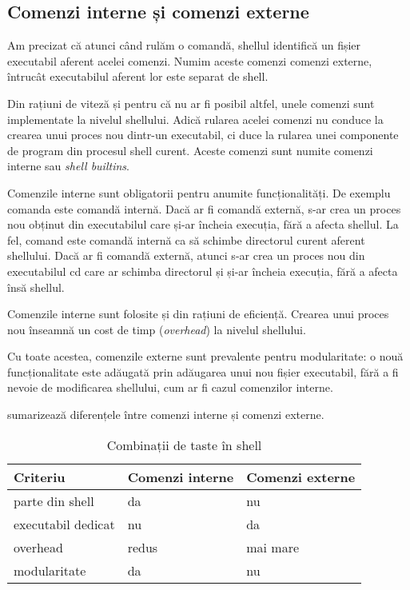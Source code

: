 \subsection{Comenzi interne și comenzi externe}
\label{sec:cli:shell:command-types}

Am precizat că atunci când rulăm o comandă, shellul identifică un fișier
executabil aferent acelei comenzi. Numim aceste comenzi comenzi externe,
întrucât executabilul aferent lor este separat de shell.

Din rațiuni de viteză și pentru că nu ar fi posibil altfel, unele comenzi sunt
implementate la nivelul shellului. Adică rularea acelei comenzi nu conduce la
crearea unui proces nou dintr-un executabil, ci duce la rularea unei componente
de program din procesul shell curent. Aceste comenzi sunt numite comenzi interne
sau \textit{shell builtins}.

Comenzile interne sunt obligatorii pentru anumite funcționalități. De exemplu
comanda  este comandă internă. Dacă ar fi comandă externă, s-ar crea un
proces nou obținut din executabilul  care și-ar încheia execuția, fără a
afecta shellul. La fel, comand  este comandă internă ca să schimbe directorul
curent aferent shellului. Dacă ar fi comandă externă, atunci s-ar crea un
proces nou din executabilul cd care ar schimba directorul și și-ar încheia
execuția, fără a afecta însă shellul.

Comenzile interne sunt folosite și din rațiuni de eficiență. Crearea unui proces
nou înseamnă un cost de timp (\textit{overhead}) la nivelul shellului.

Cu toate acestea, comenzile externe sunt prevalente pentru modularitate: o nouă
funcționalitate este adăugată prin adăugarea unui nou fișier executabil, fără a
fi nevoie de modificarea shellului, cum ar fi cazul comenzilor interne.

 sumarizează diferențele între comenzi interne și comenzi
externe.

\begin{table}[!htb]
  \begin{center}
    \begin{tabular}{ p{} p{} p{} }
      \toprule
        \textbf{Criteriu} &
        \textbf{Comenzi interne} &
        \textbf{Comenzi externe} \\
      \midrule
        parte din shell &
        da &
        nu \\
      \midrule
        executabil dedicat &
        nu &
        da \\
      \midrule
        overhead &
        redus &
        mai mare \\
      \midrule
        modularitate &
        da &
        nu \\
      \bottomrule
    \end{tabular}
  \end{center}
  \caption{Combinații de taste în shell}
  \label{tab:cli:internal-vs-external}
\end{table}

